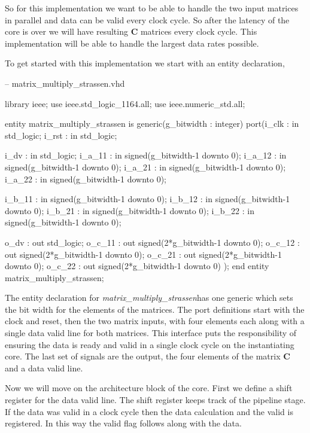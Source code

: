 So for this implementation we want to be able to handle the two input matrices in parallel and data can be valid every clock cycle. So after the latency of the core is over we will have resulting $\mathbf{C}$ matrices every clock cycle. This implementation will be able to handle the largest data rates possible. 

To get started with this implementation we start with an entity declaration,

\begin{VHDLlisting}[tabsize=2]
-- matrix_multiply_strassen.vhd

library ieee;
	use ieee.std_logic_1164.all;
	use ieee.numeric_std.all;
	
entity matrix_multiply_strassen is
	generic(g_bitwidth : integer)
	port(i_clk    : in    std_logic;
		 i_rst    : in    std_logic;
		 
		 i_dv     : in    std_logic;
		 i_a_11   : in    signed(g_bitwidth-1 downto 0);
		 i_a_12   : in    signed(g_bitwidth-1 downto 0);
		 i_a_21   : in    signed(g_bitwidth-1 downto 0);
		 i_a_22   : in    signed(g_bitwidth-1 downto 0);
		
		 i_b_11   : in    signed(g_bitwidth-1 downto 0);
		 i_b_12   : in    signed(g_bitwidth-1 downto 0);
		 i_b_21   : in    signed(g_bitwidth-1 downto 0);
		 i_b_22   : in    signed(g_bitwidth-1 downto 0);
		 
		 o_dv     :   out std_logic;
		 o_c_11   :   out signed(2*g_bitwidth-1 downto 0);
		 o_c_12   :   out signed(2*g_bitwidth-1 downto 0);
		 o_c_21   :   out signed(2*g_bitwidth-1 downto 0);
		 o_c_22   :   out signed(2*g_bitwidth-1 downto 0)	
	);
end entity matrix_multiply_strassen;
\end{VHDLlisting}

The entity declaration for \emph{matrix\_multiply\_strassen}has one generic which sets the bit width for the elements of the matrices. The port definitions start with the clock and reset, then the two matrix inputs, with four elements each along with a single data valid line for both matrices. This interface puts the responsibility of ensuring the data is ready and valid in a single clock cycle on the instantiating core. The last set of signals are the output, the four elements of the matrix $\mathbf{C}$ and a data valid line. 

Now we will move on the architecture block of the core. First we define a shift register for the data valid line. The shift register keeps track of the pipeline stage. If the data was valid in a clock cycle then the data calculation and the valid is registered. In this way the valid flag follows along with the data. 

